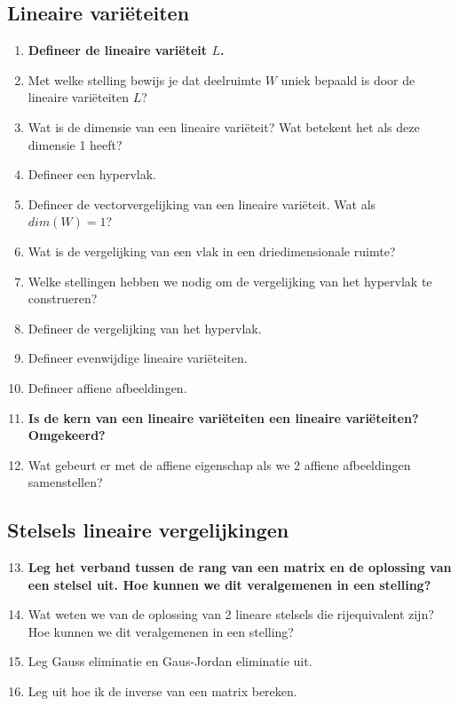 \documentclass[12pt]{article}
\begin{document}
    \subsection{Lineaire variëteiten}
    \begin{enumerate}
        \item \textbf{Defineer de lineaire variëteit $L$.}
        \item Met welke stelling bewijs je dat deelruimte $W$ uniek bepaald is door de lineaire variëteiten $L$?
        \item Wat is de dimensie van een lineaire variëteit? Wat betekent het als deze dimensie 1 heeft?
        \item Defineer een hypervlak.
        \item Defineer de vectorvergelijking van een lineaire variëteit. Wat als $dim(W)=1$?
        \item Wat is de vergelijking van een vlak in een driedimensionale ruimte?
        \item Welke stellingen hebben we nodig om de vergelijking van het hypervlak te construeren?
        \item Defineer de vergelijking van het hypervlak.
        \item Defineer evenwijdige lineaire variëteiten.
        \item Defineer affiene afbeeldingen.
        \item \textbf{Is de kern van een lineaire variëteiten een lineaire variëteiten? Omgekeerd?}
        \item Wat gebeurt er met de affiene eigenschap als we 2 affiene afbeeldingen samenstellen?
    \end{enumerate}
    \subsection{Stelsels lineaire vergelijkingen}
    \begin{enumerate}
        \setcounter{enumi}{12}
        \item \textbf{Leg het verband tussen de rang van een matrix en de oplossing van een stelsel uit. Hoe kunnen we dit veralgemenen in een stelling?}
        \item Wat weten we van de oplossing van 2 lineare stelsels die rijequivalent zijn? Hoe kunnen we dit veralgemenen in een stelling?
        \item Leg Gauss eliminatie en Gaus-Jordan eliminatie uit.
        \item Leg uit hoe ik de inverse van een matrix bereken.
    \end{enumerate}
\end{document}
